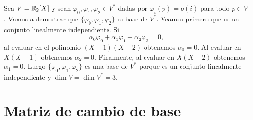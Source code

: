 %
%
%		

\begin{example}
	Sea $V=\mathbb{R}_2[X]$ y sean $\varphi_0,\varphi_1,\varphi_2\in V^*$ dadas por
	$\varphi_i(p)=p(i)$ para todo $p\in V$. Vamos a demostrar que
	$\{\varphi_0,\varphi_1,\varphi_2\}$ es base de $V^*$. Veamos primero que es
	un conjunto linealmente independiente. Si 
	\[
		\alpha_0\varphi_0+\alpha_1\varphi_1+\alpha_2\varphi_2=0, 
	\]
	al evaluar en el polinomio $(X-1)(X-2)$ obtenemos $\alpha_0=0$.
	Al evaluar en $X(X-1)$ obtenemos $\alpha_2=0$. Finalmente, al evaluar en $X(X-2)$
	obtenemos $\alpha_1=0$.  Luego $\{\varphi_0,\varphi_1,\varphi_2\}$ es una
	base de $V^*$ porque es un conjunto linealmente independiente y 
	$\dim V=\dim V^*=3$.
\end{example}

\section{Matriz de cambio de base}

